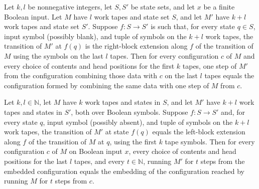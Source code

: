 \begin{lemma}
\label{Turing.FinTM.rightCfg_step}
\leanok
{}
Let $k,l$ be nonnegative integers, let $S,S'$ be state sets, and let $x$ be a finite
Boolean input. Let $M$ have $l$ work tapes and state set $S$, and let $M'$ have $k+l$
work tapes and state set $S'$. Suppose $f:S\to S'$ is such that, for every state $q\in
S$, input symbol (possibly blank), and tuple of symbols on the $k+l$ work tapes, the
transition of $M'$ at $f(q)$ is the right-block extension along $f$ of the transition of
$M$ using the symbols on the last $l$ tapes. Then for every configuration $c$ of $M$ and
every choice of contents and head positions for the first $k$ tapes, one step of $M'$
from the configuration combining those data with $c$ on the last $l$ tapes equals the
configuration formed by combining the same data with one step of $M$ from $c$.
\end{lemma}

\begin{lemma}
\label{Turing.FinTM.leftCfg_run}
\leanok
{}
Let $k,l\in\mathbb N$, let $M$ have $k$ work tapes and states in $S$, and let $M'$ have
$k+l$ work tapes and states in $S'$, both over Boolean symbols. Suppose $f:S\to S'$ and,
for every state $q$, input symbol (possibly absent), and tuple of symbols on the $k+l$
work tapes, the transition of $M'$ at state $f(q)$ equals the left-block extension along
$f$ of the transition of $M$ at $q$, using the first $k$ tape symbols. Then for every
configuration $c$ of $M$ on Boolean input $x$, every choice of contents and head
positions for the last $l$ tapes, and every $t\in\mathbb N$, running $M'$ for $t$ steps
from the embedded configuration equals the embedding of the configuration reached by
running $M$ for $t$ steps from $c$.
\end{lemma}

